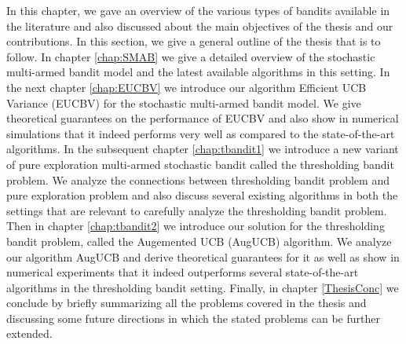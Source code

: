 In this chapter, we gave an overview of the various types of bandits available in the literature and also discussed about the main objectives of the thesis and our contributions. In this section, we give a general outline of the thesis that is to follow. In chapter \ref{chap:SMAB} we give a detailed overview of the stochastic multi-armed bandit model and the latest available algorithms in this setting. In the next chapter \ref{chap:EUCBV} we introduce our algorithm Efficient UCB Variance (EUCBV) for the stochastic multi-armed bandit model. We give theoretical guarantees on the performance of EUCBV and also show in numerical simulations that it indeed performs very well as compared to the state-of-the-art algorithms. In the subsequent chapter \ref{chap:tbandit1} we introduce a new variant of pure exploration multi-armed stochastic bandit called the thresholding bandit problem. We analyze the connections between thresholding bandit problem and pure exploration problem and also discuss several existing algorithms in both the settings that are relevant to carefully analyze the thresholding bandit problem. Then in chapter \ref{chap:tbandit2} we introduce our solution for the thresholding bandit problem, called the Augemented UCB (AugUCB) algorithm. We analyze our algorithm AugUCB and derive theoretical guarantees for it as well as show in numerical experiments that it indeed outperforms several state-of-the-art algorithms in the thresholding bandit setting. Finally, in chapter \ref{ThesisConc} we conclude by briefly summarizing all the problems covered in the thesis and discussing some future directions in which the stated problems can be further extended.



